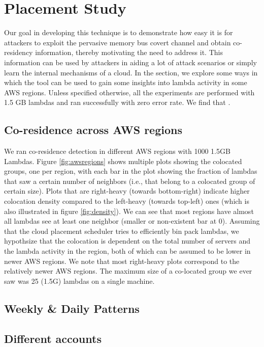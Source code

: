 \section{Placement Study}
\label{sec:study}

Our goal in developing this technique is to demonstrate how 
easy it is for attackers to exploit the pervasive memory bus covert 
channel and obtain co-residency information, thereby motivating 
the need to address it. This information can be used by attackers 
in aiding a lot of attack scenarios  or simply learn 
the internal mechanisms of a cloud. In the section, we explore some 
ways in which the tool can be used to gain some insights into lambda 
activity in some AWS regions. Unless specified otherwise, all the 
experiments are performed with 1.5 GB lambdas and ran successfully with
zero error rate. We find that .


\subsection{Co-residence across AWS regions}
We ran co-residence detection in different AWS regions with 
1000 1.5GB Lambdas. Figure \ref{fig:awsregions} shows multiple 
plots showing the colocated groups, one per region, with each 
bar in the plot showing the 
fraction of lambdas that saw a certain number of neighbors (i.e.,
that belong to a colocated group of certain size). Plots that 
are right-heavy (towards bottom-right) indicate higher colocation density
compared to the left-heavy (towards top-left) ones (which is also illustrated in 
figure \ref{fig:density}). We can see that most 
regions have almost all lambdas see at least one neighbor (smaller 
or non-existent bar at 0). Assuming that the cloud placement scheduler
tries to efficiently bin pack lambdas, we hypothsize that the 
colocation is dependent on the total number of servers and the lambda
activity in the region, both of which can be assumed to be lower 
in newer AWS regions. We note that most right-heavy plots correspond 
to the relatively newer AWS regions. The maximum size of a 
co-located group we ever saw was 25 (1.5G) lambdas on a single machine.


\subsection{Weekly \& Daily Patterns}


\subsection{Different accounts}
